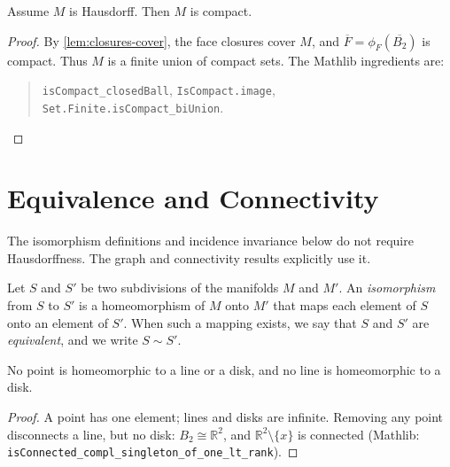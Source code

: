       \begin{lemma}\label{lem:compact}

        Assume $M$ is Hausdorff. Then $M$ is compact.
      \end{lemma}
      \begin{proof}

        By \cref{lem:closures-cover}, the face closures cover $M$, and $\overline{F} =
        \phi_F(\overline{B_2})$ is compact. Thus $M$ is a finite union of
        compact sets. The Mathlib ingredients are:
        \begin{quote}\small
          \texttt{isCompact\_closedBall}, \texttt{IsCompact.image},\\
          \texttt{Set.Finite.isCompact\_biUnion}.
        \end{quote}
      \end{proof}

  \section{Equivalence and Connectivity}

    The isomorphism definitions and incidence invariance below do not require
    Hausdorffness. The graph and connectivity results explicitly use it.

    \begin{definition}\label{def:isomorphism-equivalent}

      Let $S$ and $S'$ be two subdivisions of the manifolds $M$ and $M'$. An
      \emph{isomorphism} from $S$ to $S'$ is a homeomorphism of $M$ onto $M'$
      that maps each element of $S$ onto an element of $S'$. When such a
      mapping exists, we say that $S$ and $S'$ are \emph{equivalent}, and we
      write $S \sim S'$.
    \end{definition}

    \begin{lemma}\label{lem:shapes-distinct}

      No point is homeomorphic to a line or a disk, and no line is homeomorphic
      to a disk.
    \end{lemma}
    \begin{proof}

      A point has one element; lines and disks are infinite. Removing any point
      disconnects a line, but no disk: $B_2 \cong \mathbb{R}^2$, and
      $\mathbb{R}^2 \setminus \{x\}$ is connected (Mathlib:
      \texttt{isConnected\_compl\_singleton\_of\_one\_lt\_rank}).
    \end{proof}

